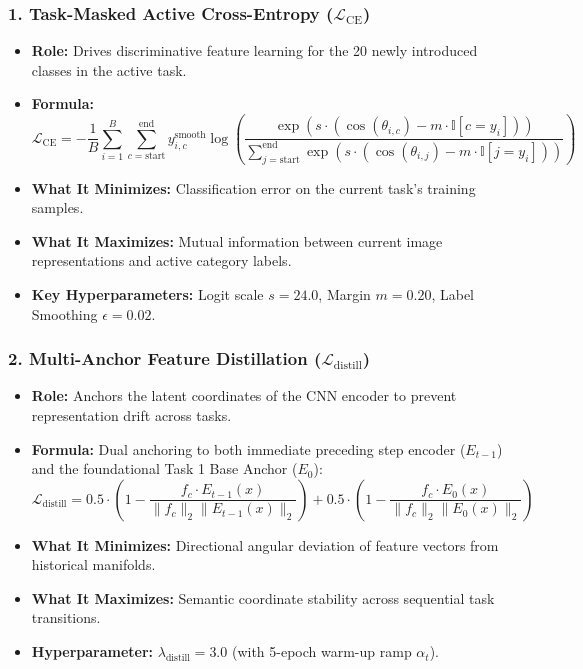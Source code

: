 \documentclass[11pt,a4paper]{article}
\begin{document}
    \subsubsection{1. Task-Masked Active Cross-Entropy ($\mathcal{L}_{\text{CE}}$)}
    \begin{itemize}[leftmargin=*]
        \item \textbf{Role:} Drives discriminative feature learning for the 20 newly introduced classes in the active task.
        \item \textbf{Formula:}
        \begin{equation}
            \mathcal{L}_{\text{CE}} = - \frac{1}{B} \sum_{i=1}^{B} \sum_{c=\text{start}}^{\text{end}} y_{i, c}^{\text{smooth}} \log \left( \frac{\exp(s \cdot (\cos(\theta_{i, c}) - m \cdot \mathbb{I}[c = y_i]))}{\sum_{j=\text{start}}^{\text{end}} \exp(s \cdot (\cos(\theta_{i, j}) - m \cdot \mathbb{I}[j = y_i]))} \right)
        \end{equation}
        \item \textbf{What It Minimizes:} Classification error on the current task's training samples.
        \item \textbf{What It Maximizes:} Mutual information between current image representations and active category labels.
        \item \textbf{Key Hyperparameters:} Logit scale $s=24.0$, Margin $m=0.20$, Label Smoothing $\epsilon = 0.02$.
    \end{itemize}

    \subsubsection{2. Multi-Anchor Feature Distillation ($\mathcal{L}_{\text{distill}}$)}
    \begin{itemize}[leftmargin=*]
        \item \textbf{Role:} Anchors the latent coordinates of the CNN encoder to prevent representation drift across tasks.
        \item \textbf{Formula:} Dual anchoring to both immediate preceding step encoder ($E_{t-1}$) and the foundational Task 1 Base Anchor ($E_0$):
        \begin{equation}
            \mathcal{L}_{\text{distill}} = 0.5 \cdot \left( 1 - \frac{f_c \cdot E_{t-1}(x)}{\|f_c\|_2 \|E_{t-1}(x)\|_2} \right) + 0.5 \cdot \left( 1 - \frac{f_c \cdot E_0(x)}{\|f_c\|_2 \|E_0(x)\|_2} \right)
        \end{equation}
        \item \textbf{What It Minimizes:} Directional angular deviation of feature vectors from historical manifolds.
        \item \textbf{What It Maximizes:} Semantic coordinate stability across sequential task transitions.
        \item \textbf{Hyperparameter:} $\lambda_{\text{distill}} = 3.0$ (with 5-epoch warm-up ramp $\alpha_t$).
    \end{itemize}
\end{document}
